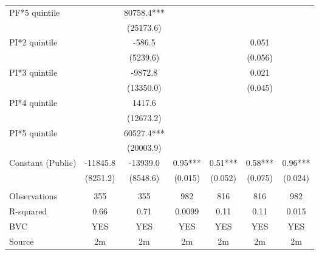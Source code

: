 \begin{tabular}{lcccccc}
PF*5 quintile &       & 80758.4*** &       &       &       &  \\
      &       & (25173.6) &       &       &       &  \\
PI*2 quintile &       & -586.5 &       &       & 0.051 &  \\
      &       & (5239.6) &       &       & (0.056) &  \\
PI*3 quintile &       & -9872.8 &       &       & 0.021 &  \\
      &       & (13350.0) &       &       & (0.045) &  \\
PI*4 quintile &       & 1417.6 &       &       &       &  \\
      &       & (12673.2) &       &       &       &  \\
PI*5 quintile &       & 60527.4*** &       &       &       &  \\
      &       & (20003.9) &       &       &       &  \\
Constant (Public) & -11845.8 & -13939.0 & 0.95*** & 0.51*** & 0.58*** & 0.96*** \\
      & (8251.2) & (8548.6) & (0.015) & (0.052) & (0.075) & (0.024) \\
      &       &       &       &       &       &  \\
\midrule
Observations & 355   & 355   & 982   & 816   & 816   & 982 \\
R-squared & 0.66  & 0.71  & 0.0099 & 0.11  & 0.11  & 0.015 \\
BVC   & YES   & YES   & YES   & YES   & YES   & YES \\
Source & 2m    & 2m    & 2m    & 2m    & 2m    & 2m \\
\bottomrule
\bottomrule
\end{tabular}%
